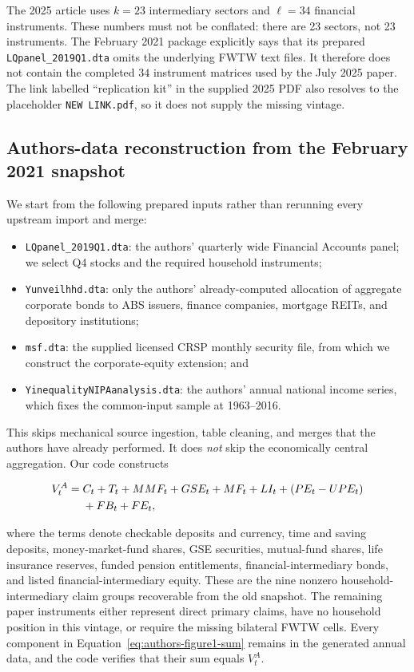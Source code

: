 \documentclass[11pt]{article}
\newcommand{\code}[1]{\texttt{#1}}
\begin{document}
The 2025 article uses $k=23$ intermediary sectors and $\ell=34$ financial
instruments.  These numbers must not be conflated: there are 23 sectors, not
23 instruments.  The February 2021 package explicitly says that its prepared
\code{LQpanel\_2019Q1.dta} omits the underlying FWTW text files.  It therefore
does not contain the completed $34$ instrument matrices used by the July 2025
paper.  The link labelled ``replication kit'' in the supplied 2025 PDF also
resolves to the placeholder \code{NEW LINK.pdf}, so it does not supply the
missing vintage.

\subsection{Authors-data reconstruction from the February 2021 snapshot}

We start from the following prepared inputs rather than rerunning every
upstream import and merge:

\begin{itemize}
  \item \code{LQpanel\_2019Q1.dta}: the authors' quarterly wide Financial
        Accounts panel; we select Q4 stocks and the required household
        instruments;
  \item \code{Yunveilhhd.dta}: only the authors' already-computed allocation
        of aggregate corporate bonds to ABS issuers, finance companies,
        mortgage REITs, and depository institutions;
  \item \code{msf.dta}: the supplied licensed CRSP monthly security file,
        from which we construct the corporate-equity extension; and
  \item \code{YinequalityNIPAanalysis.dta}: the authors' annual national
        income series, which fixes the common-input sample at 1963--2016.
\end{itemize}

This skips mechanical source ingestion, table cleaning, and merges that the
authors have already performed.  It does \emph{not} skip the economically
central aggregation.  Our code constructs

\begin{align}
  V_t^{A}={}&C_t+T_t+MMF_t+GSE_t+MF_t+LI_t
    +(PE_t-UPE_t) \notag\\
    &+FB_t+FE_t,
  \label{eq:authors-figure1-sum}
\end{align}

where the terms denote checkable deposits and currency, time and saving
deposits, money-market-fund shares, GSE securities, mutual-fund shares, life
insurance reserves, funded pension entitlements, financial-intermediary bonds,
and listed financial-intermediary equity.  These are the nine nonzero
household-intermediary claim groups recoverable from the old snapshot.  The
remaining paper instruments either represent direct primary claims, have no
household position in this vintage, or require the missing bilateral FWTW
cells.  Every component in Equation~\eqref{eq:authors-figure1-sum} remains in
the generated annual data, and the code verifies that their sum equals
$V_t^{A}$.
\end{document}

